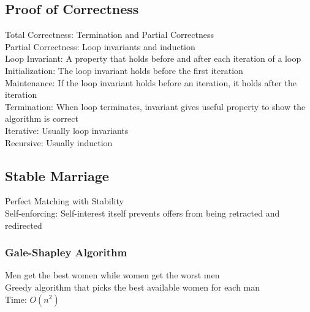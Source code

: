 \documentclass{article}
\author{Ian Chen}
\date{\today}
\begin{document}
    \begin{multicols*}{2}
        \subsection*{Proof of Correctness}
        Total Correctness: Termination and Partial Correctness\\
        Partial Correctness: Loop invariants and induction\\
        Loop Invariant: A property that holds before and after each iteration of a loop\\
        Initialization: The loop invariant holds before the first iteration\\
        Maintenance: If the loop invariant holds before an iteration, it holds after the iteration\\
        Termination: When loop terminates, invariant gives useful property to show the algorithm is
        correct\\
        Iterative: Usually loop invariants\\
        Recursive: Usually induction
        \subsection*{Stable Marriage}
        Perfect Matching with Stability\\
        Self-enforcing: Self-interest itself prevents offers from being retracted and redirected
        \subsubsection*{Gale-Shapley Algorithm}
        Men get the best women while women get the worst men\\
        Greedy algorithm that picks the best available women for each man\\
        Time: $O(n^2)$

\end{multicols*}
\end{document}
